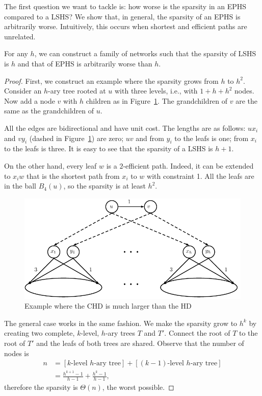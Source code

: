 The first question we want to tackle is: how worse is the sparsity in an EPHS compared to a LSHS?
We show that, in general, the sparsity of an EPHS is arbitrarily worse.
Intuitively, this occurs when shortest and efficient paths are unrelated. 

\begin{proposition}\label{prop:treelike}
For any $h$, we can construct a family of networks such that the sparsity of LSHS is $h$ and that of EPHS is arbitrarily worse than $h$.
\end{proposition}
\begin{proof}
First, we construct an example where the sparsity grows from $h$ to $h^2$.
Consider an $h$-ary tree rooted at $u$ with three levels, i.e., with $1+h+h^2$ nodes.
Now add a node $v$ with $h$ children as in Figure~\ref{fig:treelike}. 
The grandchildren of $v$ are the same as the grandchildren of $u$.

All the edges are bidirectional and have unit cost.
The lengths are as follows: $ux_i$ and $vy_i$ (dashed in Figure~\ref{fig:treelike}) are zero; $uv$ and from $y_i$ to the leafs is one; from $x_i$ to the leafs is three.
It is easy to see that the sparsity of a LSHS is $h+1$.

On the other hand, every leaf $w$ is a $2$-efficient path.
Indeed, it can be extended to $x_iw$ that is the shortest path from $x_i$ to $w$ with constraint 1.
All the leafs are in the ball $B_4(u)$, so the sparsity is at least $h^2$.

\begin{figure}
\caption{Example where the CHD is much larger than the HD}
\label{fig:treelike}
\centering
\includegraphics[scale=0.6]{TexImg/Treelike.pdf}
\end{figure}

The general case works in the same fashion.
We make the sparsity grow to $h^k$ by creating two complete, $k$-level, $h$-ary trees $T$ and $T'$.
Connect the root of $T$ to the root of $T'$ and the leafs of both trees are shared.
Observe that the number of nodes is 
\begin{align*}
n &=[\text{$k$-level $h$-ary tree}] + [\text{$(k-1)$-level $h$-ary tree}]\\
&= \frac{h^{k+1}-1}{h-1} + \frac{h^k-1}{h-1},
\end{align*}
therefore the sparsity is $\Theta(n)$, the worst possible.
\end{proof}

